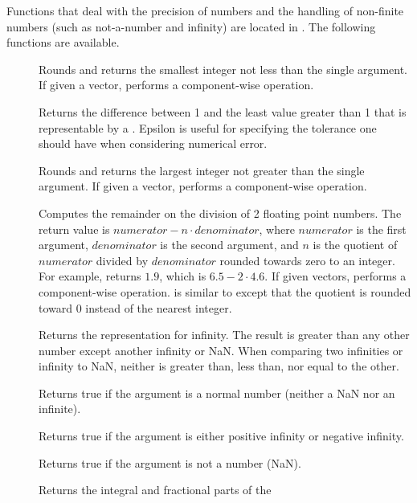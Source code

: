 Functions that deal with the precision of numbers and the handling of
non-finite numbers (such as not-a-number and infinity) are located in
. The following functions are available.

\begin{description}
\item[]   Rounds
  and returns the smallest integer not less than the single argument. If
  given a vector, performs a component-wise operation.
\item[] Returns the difference between 1 and the least
  value greater than 1 that is representable by a . Epsilon is
  useful for specifying the tolerance one should have when considering
  numerical error.
\item[]   Rounds
  and returns the largest integer not greater than the single argument. If
  given a vector, performs a component-wise operation.
\item[]  Computes the remainder on the
  division of 2 floating point numbers. The return value is $numerator - n
  \cdot denominator$, where $numerator$ is the first argument,
  $denominator$ is the second argument, and $n$ is the quotient of
  $numerator$ divided by $denominator$ rounded towards zero to an
  integer. For example,  returns
  $1.9$, which is $6.5 - 2\cdot4.6$. If given vectors,
   performs a component-wise
  operation.  is similar to 
  except that the quotient is rounded toward 0 instead of the nearest
  integer.
\item[] Returns the  representation for
  infinity. The result is greater than any other number except another
  infinity or NaN. When comparing two infinities or infinity to NaN,
  neither is greater than, less than, nor equal to the other.
\item[] Returns true if the argument is a normal number
  (neither a NaN nor an infinite).
\item[] Returns true if the argument is either positive
  infinity or negative infinity.
\item[] Returns true if the argument is not a number (NaN).
\item[] Returns the integral and fractional parts of the

\end{description}
